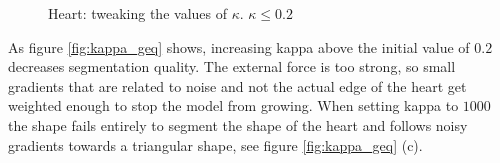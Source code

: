 \begin{figure}[!hbt]
\centering   
{}
\caption{Heart: tweaking the values of $ \kappa $. $\kappa \leq 0.2$}
\label{fig:kappa_leq}
\end{figure}

As figure \ref{fig:kappa_geq} shows, increasing kappa above the initial value of $0.2$ decreases segmentation quality. The external force is too strong, so small gradients that are related to noise and not the actual edge of the heart get weighted enough to stop the model from growing. When setting kappa to $1000$ the shape fails entirely to segment the shape of the heart and follows noisy gradients towards a triangular shape, see figure \ref{fig:kappa_geq} (c).

